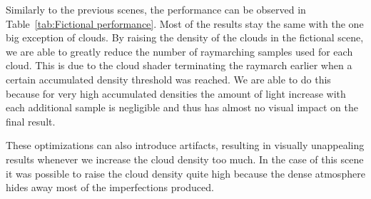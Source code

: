 \documentclass{ctuthesis}
\begin{document}
Similarly to the previous scenes, the performance can be observed in Table~\ref{tab:Fictional performance}. Most of the results
stay the same with the one big exception of clouds. By raising the density of the clouds in the fictional scene, we are able 
to greatly reduce the number of raymarching samples used for each cloud. This is due to the cloud shader terminating the 
raymarch earlier when a certain accumulated density threshold was reached. We are able to do this because for very high
accumulated densities the amount of light increase with each additional sample is negligible and thus has almost no visual
impact on the final result.

These optimizations can also introduce artifacts, resulting in visually unappealing results whenever we increase the 
cloud density too much. In the case of this scene it was possible to raise
the cloud density quite high because the dense atmosphere hides away most of the imperfections produced.
\end{document}
